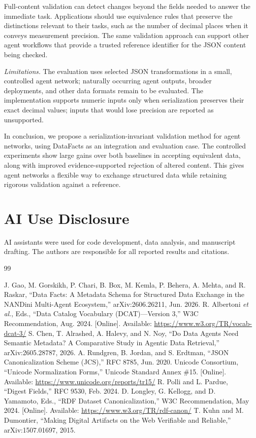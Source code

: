 \documentclass[conference]{IEEEtran}
\begin{document}
Full-content validation can detect changes beyond the fields needed to answer the immediate task.
Applications should use equivalence rules that preserve the distinctions relevant to their tasks, such as the number of decimal places when it conveys measurement precision.
The same validation approach can support other agent workflows that provide a trusted reference identifier for the JSON content being checked.

\emph{Limitations.} The evaluation uses selected JSON transformations in a small, controlled agent network; naturally occurring agent outputs, broader deployments, and other data formats remain to be evaluated.
The implementation supports numeric inputs only when serialization preserves their exact decimal values; inputs that would lose precision are reported as unsupported.

In conclusion, we propose a serialization-invariant validation method for agent networks, using DataFacts as an integration and evaluation case.
The controlled experiments show large gains over both baselines in accepting equivalent data, along with improved evidence-supported rejection of altered content.
This gives agent networks a flexible way to exchange structured data while retaining rigorous validation against a reference.

\section*{AI Use Disclosure}
AI assistants were used for code development, data analysis, and manuscript drafting.
The authors are responsible for all reported results and citations.

\begin{thebibliography}{99}\scriptsize\raggedright\setlength{\itemsep}{0pt plus 0.3pt}
 J. Gao, M. Gorskikh, P. Chari, B. Box, M. Kemla, P. Behera, A. Mehta, and R. Raskar, ``Data Facts: A Metadata Schema for Structured Data Exchange in the NANDini Multi-Agent Ecosystem,'' arXiv:2606.26211, Jun. 2026.
 R. Albertoni \emph{et al.}, Eds., ``Data Catalog Vocabulary (DCAT)---Version 3,'' W3C Recommendation, Aug. 2024. [Online]. Available: \url{https://www.w3.org/TR/vocab-dcat-3/}
 S. Chen, T. Alrashed, A. Halevy, and N. Noy, ``Do Data Agents Need Semantic Metadata? A Comparative Study in Agentic Data Retrieval,'' arXiv:2605.28787, 2026.
 A. Rundgren, B. Jordan, and S. Erdtman, ``JSON Canonicalization Scheme (JCS),'' RFC 8785, Jun. 2020.
 Unicode Consortium, ``Unicode Normalization Forms,'' Unicode Standard Annex \#15. [Online]. Available: \url{https://www.unicode.org/reports/tr15/}
 R. Polli and L. Pardue, ``Digest Fields,'' RFC 9530, Feb. 2024.
 D. Longley, G. Kellogg, and D. Yamamoto, Eds., ``RDF Dataset Canonicalization,'' W3C Recommendation, May 2024. [Online]. Available: \url{https://www.w3.org/TR/rdf-canon/}
 T. Kuhn and M. Dumontier, ``Making Digital Artifacts on the Web Verifiable and Reliable,'' arXiv:1507.01697, 2015.
\end{thebibliography}
\end{document}
